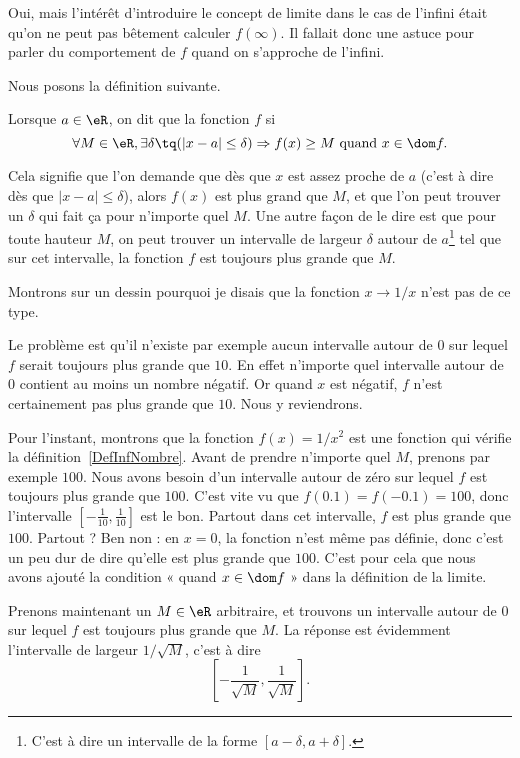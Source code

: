 Oui, mais l'intérêt d'introduire le concept de limite dans le cas de l'infini était qu'on ne peut pas bêtement calculer $f(\infty)$. Il fallait donc une astuce pour parler du comportement de $f$ quand on s'approche de l'infini.

Nous posons la définition suivante.
\begin{definition}      \label{DefInfNombre}
Lorsque $a\in\eR$, on dit que la fonction $f$  si
\[
  \forall M\in\eR,\exists \delta\tq (| x-a |\leq \delta )\Rightarrow f(x)\geq M\text{ quand }x\in\dom f.
\]
\end{definition}
Cela signifie que l'on demande que dès que $x$ est assez proche de $a$ (c'est à dire dès que $| x-a |\leq\delta$), alors $f(x)$ est plus grand que $M$, et que l'on peut trouver un $\delta$ qui fait ça pour n'importe quel $M$. Une autre façon de le dire est que pour toute hauteur $M$, on peut trouver un intervalle de largeur $\delta$ autour de $a$\footnote{C'est à dire un intervalle de la forme $[a-\delta,a+\delta]$.} tel que sur cet intervalle, la fonction $f$ est toujours plus grande que $M$.

Montrons sur un dessin pourquoi je disais que la fonction $x\to 1/x$ n'est pas de ce type.


Le problème est qu'il n'existe par exemple aucun intervalle autour de $0$ sur lequel $f$ serait toujours plus grande que $10$. En effet n'importe quel intervalle autour de $0$ contient au moins un nombre négatif. Or quand $x$ est négatif, $f$ n'est certainement pas plus grande que $10$. Nous y reviendrons.

Pour l'instant, montrons que la fonction $f(x)=1/x^2$ est une fonction qui vérifie la définition~\ref{DefInfNombre}.  Avant de prendre n'importe quel $M$, prenons par exemple $100$. Nous avons besoin d'un intervalle autour de zéro sur lequel $f$ est toujours plus grande que $100$. C'est vite vu que $f(0.1)=f(-0.1)=100$, donc l'intervalle $[-\frac{ 1 }{ 10 },\frac{1}{ 10 }]$ est le bon. Partout dans cet intervalle, $f$ est plus grande que $100$. Partout ? Ben non : en $x=0$, la fonction n'est même pas définie, donc c'est un peu dur de dire qu'elle est plus grande que $100$. C'est pour cela que nous avons ajouté la condition « quand $x\in\dom f$ » dans la définition de la limite.

Prenons maintenant un $M\in\eR$ arbitraire, et trouvons un intervalle autour de $0$ sur lequel $f$ est toujours plus grande que $M$. La réponse est évidemment l'intervalle de largeur $1/\sqrt{M}$, c'est à dire
\[
  \left[ -\frac{ 1 }{ \sqrt{M} },\frac{ 1 }{ \sqrt{M} } \right].
\]

